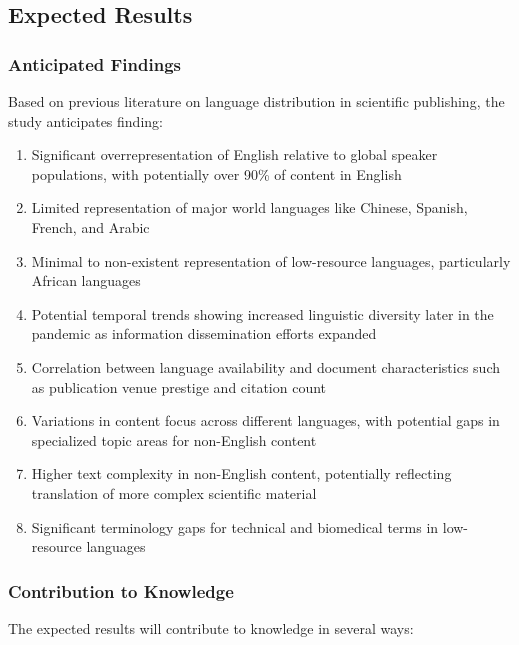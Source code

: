\documentclass[
]{article}
\providecommand{\tightlist}{%
  \setlength{\itemsep}{0pt}\setlength{\parskip}{0pt}}\usepackage{longtable,booktabs,array}
\begin{document}
\subsection{Expected Results}\label{expected-results}

\subsubsection{Anticipated Findings}\label{anticipated-findings}

Based on previous literature on language distribution in scientific
publishing, the study anticipates finding:

\begin{enumerate}
\def\labelenumi{\arabic{enumi}.}
\tightlist
\item
  Significant overrepresentation of English relative to global speaker
  populations, with potentially over 90\% of content in English
\item
  Limited representation of major world languages like Chinese, Spanish,
  French, and Arabic
\item
  Minimal to non-existent representation of low-resource languages,
  particularly African languages
\item
  Potential temporal trends showing increased linguistic diversity later
  in the pandemic as information dissemination efforts expanded
\item
  Correlation between language availability and document characteristics
  such as publication venue prestige and citation count
\item
  Variations in content focus across different languages, with potential
  gaps in specialized topic areas for non-English content
\item
  Higher text complexity in non-English content, potentially reflecting
  translation of more complex scientific material
\item
  Significant terminology gaps for technical and biomedical terms in
  low-resource languages
\end{enumerate}

\subsubsection{Contribution to
Knowledge}\label{contribution-to-knowledge}

The expected results will contribute to knowledge in several ways:
\end{document}
